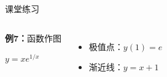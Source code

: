 \begin{frame}{课堂练习}
	\linespread{2}
	\begin{columns}[t]
		\begin{exampleblock}{{\bf 例7：}函数作图}
		\centerline{\large $y=xe^{1/x}$}
		\end{exampleblock}\pause 
		\begin{itemize}
		  \item 极值点：$y(1)=e$
		  \item 渐近线：$y=x+1$
		\end{itemize}
		\pause 
		\begin{center}
			\vspace{-3ex}
		\end{center}
	\end{columns}
\end{frame}